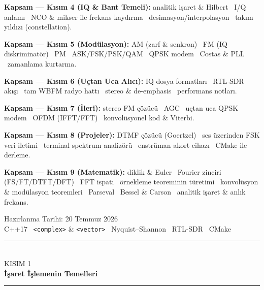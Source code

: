 \documentclass[11pt,a4paper]{article}
\newcommand{\gpart}[2]{\clearpage
  \begin{center}\vspace*{1.5cm}
  {\color{turuncu}\rule{0.7\linewidth}{1.5pt}}\\[10pt]
  {\color{ortaGri}\Large KISIM #1}\\[8pt]
  {\color{anaMavi}\Huge\bfseries #2}\\[10pt]
  {\color{turuncu}\rule{0.7\linewidth}{1.5pt}}
  \end{center}\vspace{1cm}}
\newcommand{\code}[1]{\texttt{\color{koyuGri}#1}}
\begin{document}
\begin{titlepage}
\begin{center}
{{\textbf{Kapsam --- Kısım 4 (IQ \& Bant Temeli):} analitik işaret \& Hilbert
\textbullet\ I/Q anlamı \textbullet\ NCO \& mikser ile frekans kaydırma
\textbullet\ desimasyon/interpolasyon \textbullet\ takım yıldızı (constellation).\vspace{3pt}

\textbf{Kapsam --- Kısım 5 (Modülasyon):} AM (zarf \& senkron) \textbullet\ FM (IQ diskriminatör)
\textbullet\ PM \textbullet\ ASK/FSK/PSK/QAM \textbullet\ QPSK modem \textbullet\ Costas \& PLL
\textbullet\ zamanlama kurtarma.\vspace{3pt}

\textbf{Kapsam --- Kısım 6 (Uçtan Uca Alıcı):} IQ dosya formatları \textbullet\ RTL-SDR akışı
\textbullet\ tam WBFM radyo hattı \textbullet\ stereo \& de-emphasis \textbullet\ performans notları.\vspace{3pt}

\textbf{Kapsam --- Kısım 7 (İleri):} stereo FM çözücü \textbullet\ AGC
\textbullet\ uçtan uca QPSK modem \textbullet\ OFDM (IFFT/FFT) \textbullet\ konvolüsyonel kod \& Viterbi.\vspace{3pt}

\textbf{Kapsam --- Kısım 8 (Projeler):} DTMF çözücü (Goertzel) \textbullet\ ses üzerinden FSK veri iletimi
\textbullet\ terminal spektrum analizörü \textbullet\ enstrüman akort cihazı \textbullet\ CMake ile derleme.\vspace{3pt}

\textbf{Kapsam --- Kısım 9 (Matematik):} diklik \& Euler \textbullet\ Fourier zinciri (FS/FT/DTFT/DFT)
\textbullet\ FFT ispatı \textbullet\ örnekleme teoreminin türetimi \textbullet\ konvolüsyon \& modülasyon
teoremleri \textbullet\ Parseval \textbullet\ Bessel \& Carson \textbullet\ analitik işaret \& anlık frekans.\vspace{3pt}}}
\end{center}

\vfill
{\color{ortaGri}\large Hazırlanma Tarihi: 20 Temmuz 2026}\\[4pt]
{\color{ortaGri} C++17 \textbullet\ \code{<complex>} \& \code{<vector>} \textbullet\ Nyquist--Shannon \textbullet\ RTL-SDR \textbullet\ CMake}
\vspace*{0.4cm}
\end{titlepage}

\tableofcontents
\thispagestyle{empty}
\clearpage

\gpart{1}{İşaret İşlemenin Temelleri}
\end{document}
